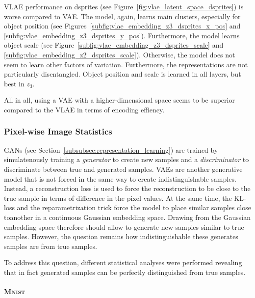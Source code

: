\ac{VLAE} performance on dsprites (see Figure~\ref{fig:vlae_latent_space_dsprites}) is worse compared to \ac{VAE}.
The model, again, learns main clusters, especially for object position (see Figures~\ref{subfig:vlae_embedding_z3_dsprites_x_pos} and \ref{subfig:vlae_embedding_z3_dsprites_y_pos}).
Furthermore, the model learns object scale (see Figure~\ref{subfig:vlae_embedding_z3_dsprites_scale} and \ref{subfig:vlae_embedding_z2_dsprites_scale}).
Otherwise, the model does not seem to learn other factors of variation.
Furthermore, the representations are not particularly disentangled.
Object position and scale is learned in all layers, but best in $z_3$.

All in all, using a \ac{VAE} with a higher-dimensional space seems to be superior compared to the \ac{VLAE} in terms of encoding effiency.

\subsubsection{Pixel-wise Image Statistics}\label{subsubsec:pixel_wise_statistics}

\acp{GAN} (see Section~\ref{subsubsec:representation_learning}) are trained by simulatenously training a \textit{generator} to create new samples and a \textit{discriminator} to discriminate between true and generated samples.
\acp{VAE} are another generative model that is not forced in the same way to create indistinguishable samples.
Instead, a reconstruction loss is used to force the reconstruction to be close to the true sample in terms of difference in the pixel values.
At the same time, the \ac{KL}-loss and the reparametrization trick force the model to place similar samples close toanother in a continuous Gaussian embedding space.
Drawing from the Gaussian embedding space therefore should allow to generate new samples similar to true samples.
However, the question remains how indistinguishable these generates samples are from true samples.

To address this question, different statistical analyses were performed revealing that in fact generated samples can be perfectly distinguished from true samples.

\paragraph{\textsc{Mnist}}

